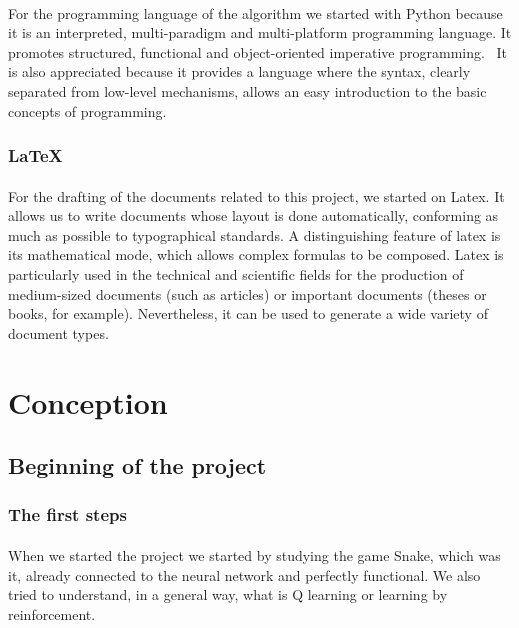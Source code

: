 \documentclass{article}
\begin{document}
\paragraph{}
\setlength{\parindent}{2cm}
For the programming language of the algorithm we started with Python because it is an interpreted, multi-paradigm and multi-platform programming language. It promotes structured, functional and object-oriented imperative programming.~\cite{python}  
It is also appreciated because it provides a language where the syntax, clearly separated from low-level mechanisms, allows an easy introduction to the basic concepts of programming.

\subsubsection{LaTeX}
\paragraph{}
\setlength{\parindent}{2cm}
For the drafting of the documents related to this project, we started on Latex. It allows us to write documents whose layout is done automatically, conforming as much as possible to typographical standards. A distinguishing feature of latex is its mathematical mode, which allows complex formulas to be composed. Latex is particularly used in the technical and scientific fields for the production of medium-sized documents (such as articles) or important documents (theses or books, for example). Nevertheless, it can be used to generate a wide variety of document types.
~\cite{latex} 
\section{Conception}
\subsection{Beginning of the project}
\subsubsection{The first steps}
\paragraph{}
\setlength{\parindent}{2cm}
When we started the project we started by studying the game Snake, which was it, already connected to the neural network and perfectly functional.  We also tried to understand, in a general way, what is Q learning or learning by reinforcement.
\end{document}
